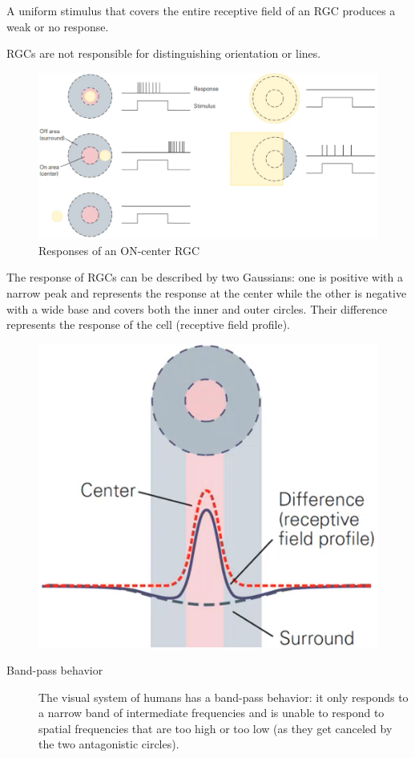 \begin{description}
        \begin{remark}
            A uniform stimulus that covers the entire receptive field of an RGC produces a weak or no response.
        \end{remark}

        \begin{remark}
            RGCs are not responsible for distinguishing orientation or lines.
        \end{remark}

        \begin{figure}[H]
            \centering
            \includegraphics[width=0.6\linewidth]{./img/on_off_center.png}
            \caption{Responses of an ON-center RGC}
        \end{figure}

        \begin{remark}
            The response of RGCs can be described by two Gaussians: 
            one is positive with a narrow peak and represents the response at the center 
            while the other is negative with a wide base and covers both the inner and outer circles.
            Their difference represents the response of the cell (receptive field profile).

            \begin{figure}[H]
                \centering
                \includegraphics[width=0.2\linewidth]{./img/visual_gaussian.png}
            \end{figure}
        \end{remark}

        \begin{description}
            \item[Band-pass behavior] 
                The visual system of humans has a band-pass behavior: it only responds to a narrow band of intermediate frequencies
                and is unable to respond to spatial frequencies that are too high or too low 
                (as they get canceled by the two antagonistic circles).


\end{description}
\end{description}
